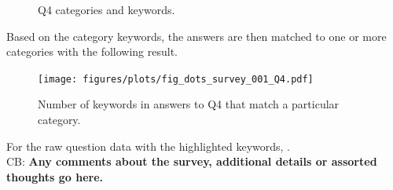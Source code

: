     \vspace{-0.3cm}
    \begin{figure}[H]
      
      \caption{Q4 categories and keywords.}
      \label{fig:ref_fig_survey_initial_Q4_categories}
    \end{figure}

    Based on the category keywords, the answers are then matched to one or more
    categories with the following result.

    \begin{figure}[H]
      \centering
      \texttt{[image: figures/plots/fig\_dots\_survey\_001\_Q4.pdf]}
      \caption{Number of keywords in answers to Q4 that match a particular category.}
      \label{fig:ref_fig_survey_initial_Q4_categories_enumeration}
    \end{figure}

    For the raw question data with the highlighted keywords,
    . \\

  CB: \textbf{%
    Any comments about the survey, additional details or assorted thoughts
    go here.
  }\\


